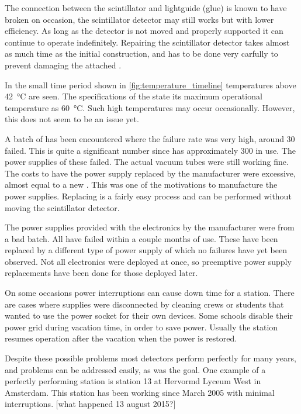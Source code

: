 The connection between the scintillator and lightguide (glue) is known to have broken on occasion, the scintillator detector may still works but with lower efficiency. As long as the detector is not moved and properly supported it can continue to operate indefinitely. Repairing the scintillator detector takes almost as much time as the initial construction, and has to be done very carfully to prevent damaging the attached \pmt.

In the small time period shown in \cref{fig:temperature_timeline} temperatures above \SI{42}{\degreeCelsius} are seen. The specifications of the \pmt state its maximum operational temperature as \SI{60}{\degreeCelsius}. Such high temperatures may occur occasionally. However, this does not seem to be an issue yet.

A batch of \pmts has been encountered where the failure rate was very high, around 30 \pmts failed. This is quite a significant number since \hisparc has approximately 300 \pmts in use. The power supplies of these \pmts failed. The actual vacuum tubes were still working fine. The costs to have the power supply replaced by the manufacturer were excessive, almost equal to a new \pmt. This was one of the motivations to manufacture the \nikhef \pmt power supplies. Replacing \pmts is a fairly easy process and can be performed without moving the scintillator detector.

The power supplies provided with the \hisparc electronics by the manufacturer were from a bad batch. All have failed within a couple months of use. These have been replaced by a different type of power supply of which no failures have yet been observed. Not all electronics were deployed at once, so preemptive power supply replacements have been done for those deployed later.

On some occasions power interruptions can cause down time for a station.  There are cases where supplies were disconnected by cleaning crews or students that wanted to use the power socket for their own devices. Some schools disable their power grid during vacation time, in order to save power. Usually the station resumes operation after the vacation when the power is restored.

Despite these possible problems most detectors perform perfectly for many years, and problems can be addressed easily, as was the goal. One example of a perfectly performing station is station 13 at Hervormd Lyceum West in Amsterdam. This station has been working since March 2005 with minimal interruptions. [what happened 13 august 2015?]
